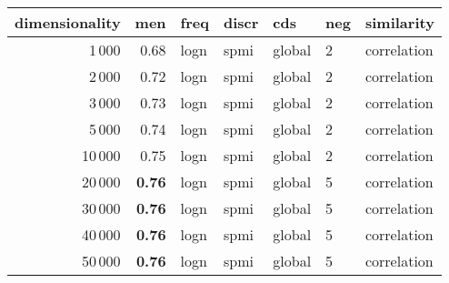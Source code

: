 \begin{tabular}{rrlllll}
\toprule
 dimensionality &   men &  freq & discr &     cds & neg &   similarity \\
\midrule
           1\,000 &  0.68 &  logn &  spmi &  global &   2 &  correlation \\
           2\,000 &  0.72 &  logn &  spmi &  global &   2 &  correlation \\
           3\,000 &  0.73 &  logn &  spmi &  global &   2 &  correlation \\
           5\,000 &  0.74 &  logn &  spmi &  global &   2 &  correlation \\
          10\,000 &  0.75 &  logn &  spmi &  global &   2 &  correlation \\
          20\,000 &  \textbf{0.76} &  logn &  spmi &  global &   5 &  correlation \\
          30\,000 &  \textbf{0.76} &  logn &  spmi &  global &   5 &  correlation \\
          40\,000 &  \textbf{0.76} &  logn &  spmi &  global &   5 &  correlation \\
          50\,000 &  \textbf{0.76} &  logn &  spmi &  global &   5 &  correlation \\
\bottomrule
\end{tabular}
